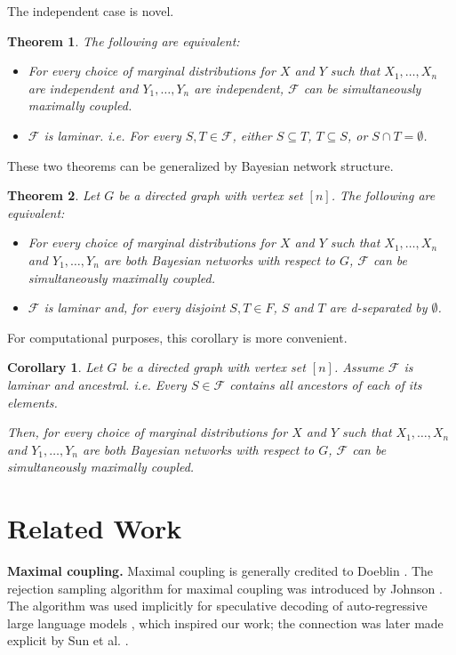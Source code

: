 \documentclass{article}
\newtheorem{theorem}{Theorem}
\newtheorem{corollary}{Corollary}
\newcommand{\F}{\mathcal{F}}
\begin{document}
The independent case is novel.

\begin{theorem}
\raggedright
The following are equivalent:
\begin{itemize}
    \item For every choice of marginal distributions for $X$ and $Y$
    such that $X_1, \dots, X_n$ are independent
    and $Y_1, \dots, Y_n$ are independent,
    $\F$ can be simultaneously maximally coupled.
    \item $\F$ is laminar. i.e. For every $S,T \in \F$, either $S \subseteq T$, $T \subseteq S$, or $S \cap T = \emptyset$.
\end{itemize}
\end{theorem}

These two theorems can be generalized by Bayesian network structure.

\begin{theorem}
\raggedright
Let $G$ be a directed graph with vertex set $[n]$. The following are equivalent:
\begin{itemize}
    \item For every choice of marginal distributions for $X$ and $Y$
    such that $X_1, \dots, X_n$ and
    $Y_1, \dots, Y_n$ are both Bayesian networks with respect to $G$,
    $\F$ can be simultaneously maximally coupled.
    \item $\F$ is laminar and, for every disjoint $S,T \in F$, $S$ and $T$ are d-separated by $\emptyset$.
\end{itemize}
\end{theorem}

For computational purposes, this corollary is more convenient.

\begin{corollary}
Let $G$ be a directed graph with vertex set $[n]$.
Assume $\F$ is laminar and ancestral.
i.e. Every $S \in \F$ contains all ancestors of each of its elements.

Then, for every choice of marginal distributions for $X$ and $Y$
such that $X_1, \dots, X_n$ and
$Y_1, \dots, Y_n$ are both Bayesian networks with respect to $G$,
$\F$ can be simultaneously maximally coupled.
\end{corollary}

\section*{Related Work}

\textbf{Maximal coupling.}
Maximal coupling is generally credited to Doeblin \cite{lindvall1991w}.
The rejection sampling algorithm for maximal coupling was introduced by Johnson \cite{johnson1998coupling}.
The algorithm was used implicitly for speculative decoding of auto-regressive large language models \cite{leviathan2023fast},
which inspired our work;
the connection was later made explicit by Sun et al. \cite{sun2024spectr}.
\end{document}
